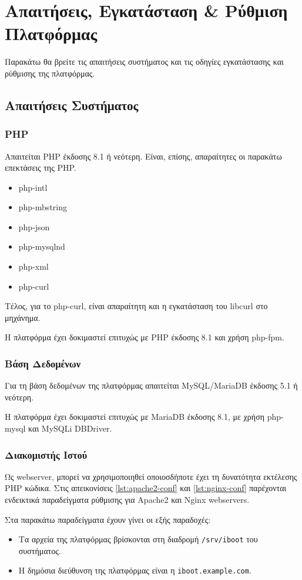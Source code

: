 \chapter{Απαιτήσεις, Εγκατάσταση \& Ρύθμιση Πλατφόρμας}
Παρακάτω θα βρείτε τις απαιτήσεις συστήματος και τις οδηγίες εγκατάστασης και ρύθμισης της πλατφόρμας.

\section{Απαιτήσεις Συστήματος}

\subsection{PHP}
Απαιτείται PHP έκδοσης 8.1 ή νεότερη.
Είναι, επίσης, απαραίτητες οι παρακάτω επεκτάσεις της PHP.

\begin{itemize}
	\item php-intl
	\item php-mbstring
	\item php-json
	\item php-mysqlnd
	\item php-xml
	\item php-curl
\end{itemize}

Τέλος, για το php-curl, είναι απαραίτητη και η εγκατάσταση του libcurl στο μηχάνημα.

Η πλατφόρμα έχει δοκιμαστεί επιτυχώς με PHP έκδοσης 8.1 και χρήση php-fpm.

\subsection{Βάση Δεδομένων}
Για τη βάση δεδομένων της πλατφόρμας απαιτείται MySQL/MariaDB έκδοσης 5.1 ή νεότερη.

Η πλατφόρμα έχει δοκιμαστεί επιτυχώς με MariaDB έκδοσης 8.1, με χρήση php-mysql και MySQLi DBDriver.

\subsection{Διακομιστής Ιστού}
Ως webserver, μπορεί να χρησιμοποιηθεί οποιοσδήποτε έχει τη δυνατότητα εκτέλεσης PHP κώδικα. Στις απεικονίσεις \ref{lst:apache2-conf} και \ref{lst:nginx-conf} παρέχονται ενδεικτικά παραδείγματα ρύθμισης για Apache2 και Nginx webservers.

Στα παρακάτω παραδείγματα έχουν γίνει οι εξής παραδοχές:
\begin{itemize}
	\item Τα αρχεία της πλατφόρμας βρίσκονται στη διαδρομή \verb!/srv/iboot! του συστήματος.
	\item Η δημόσια διεύθυνση της πλατφόρμας είναι η \verb!iboot.example.com!.
\end{itemize}

